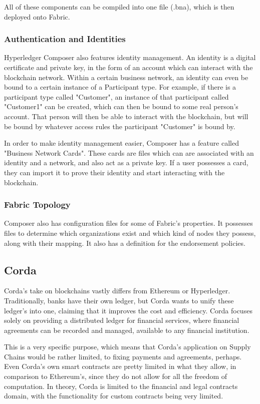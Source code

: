 All of these components can be compiled into one file (.bna), which is then deployed onto Fabric.

\subsubsection{Authentication and Identities}

Hyperledger Composer also features identity management. An identity is a digital certificate and private key, in the form of an account which can interact with the blockchain network. Within a certain business network, an identity can even be bound to a certain instance of a Participant type. For example, if there is a participant type called "Customer", an instance of that participant called "Customer1" can be created, which can then be bound to some real person's account. That person will then be able to interact with the blockchain, but will be bound by whatever access rules the participant "Customer" is bound by. 

In order to make identity management easier, Composer has a feature called "Business Network Cards". These cards are files which can are associated with an identity and a network, and also act as a private key. If a user possesses a card, they can import it to prove their identity and start interacting with the blockchain.

\subsubsection{Fabric Topology}

Composer also has configuration files for some of Fabric's properties. It possesses files to determine which organizations exist and which kind of nodes they possess, along with their mapping. It also has a definition for the endorsement policies.


\subsection{Corda}
Corda's take on blockchains vastly differs from Ethereum or Hyperledger. Traditionally, banks have their own ledger, but Corda wants to unify these ledger's into one, claiming that it improves the cost and efficiency. Corda focuses solely on providing a distributed ledger for financial services, where financial agreements can be recorded and managed, available to any financial institution\cite{Brown2016}. 

This is a very specific purpose, which means that Corda's application on Supply Chains would be rather limited, to fixing payments and agreements, perhaps. Even Corda's own smart contracts are pretty limited in what they allow, in comparison to Ethereum's, since they do not allow for all the freedom of computation. In theory, Corda is limited to the financial and legal contracts domain, with the functionality for custom contracts being very limited.

